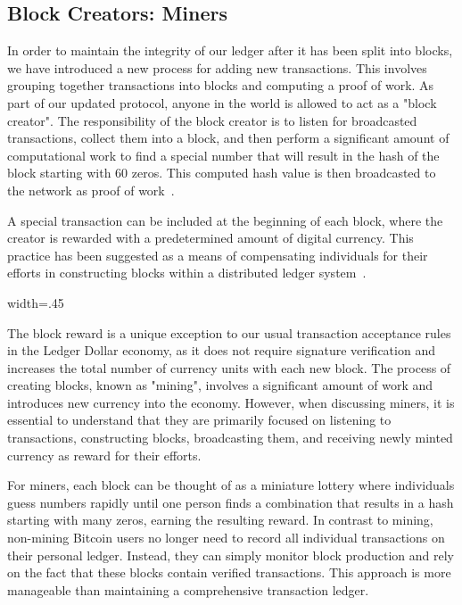 \subsection{Block Creators: Miners}
In order to maintain the integrity of our ledger after it has been split into blocks, we have introduced a new process for adding new
transactions. This involves grouping together transactions into blocks and computing a proof of work. As part of our updated protocol,
anyone in the world is allowed to act as a "block creator". The responsibility of the block creator is to listen for broadcasted transactions,
collect them into a block, and then perform a significant amount of computational work to find a special number that will result in the
hash of the block starting with 60 zeros. This computed hash value is then broadcasted to the network as proof of work~\cite{wood2014ethereum}.

A special transaction can be included at the beginning of each block, where the creator is rewarded with a predetermined amount of digital
currency. This practice has been suggested as a means of compensating individuals for their efforts in constructing blocks within a
distributed ledger system~\cite{ding2020incentive}.

{width=.45\textwidth}%

The block reward is a unique exception to our usual transaction acceptance rules in the Ledger Dollar economy, as it does not require
signature verification and increases the total number of currency units with each new block. The process of creating blocks, known as
"mining", involves a significant amount of work and introduces new currency into the economy. However, when discussing miners, it is
essential to understand that they are primarily focused on listening to transactions, constructing blocks, broadcasting them, and
receiving newly minted currency as reward for their efforts.

For miners, each block can be thought of as a miniature lottery where individuals guess numbers rapidly until one person finds a combination
that results in a hash starting with many zeros, earning the resulting reward. In contrast to mining, non-mining Bitcoin users no longer
need to record all individual transactions on their personal ledger. Instead, they can simply monitor block production and rely on the
fact that these blocks contain verified transactions. This approach is more manageable than maintaining a comprehensive transaction ledger.

